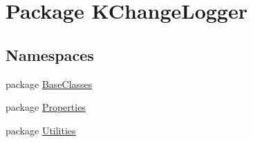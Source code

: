 \hypertarget{namespace_k_change_logger}{\section{Package K\-Change\-Logger}
\label{namespace_k_change_logger}
}
\subsection*{Namespaces}
\begin{DoxyCompactItemize}
\item 
package \hyperlink{namespace_k_change_logger_1_1_base_classes}{Base\-Classes}
\item 
package \hyperlink{namespace_k_change_logger_1_1_properties}{Properties}
\item 
package \hyperlink{namespace_k_change_logger_1_1_utilities}{Utilities}
\end{DoxyCompactItemize}
